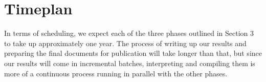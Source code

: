 \documentclass[a4paper]{article}
\begin{document}
\section{Timeplan}
In terms of scheduling, we expect each of the three phases outlined in Section 3 to take up approximately one year. The process of writing up our results and preparing the final documents for publication will take longer than that, but since our results will come in incremental batches, interpreting and compiling them is more of a continuous process running in parallel with the other phases.

%
%


{}

%
\end{document}
